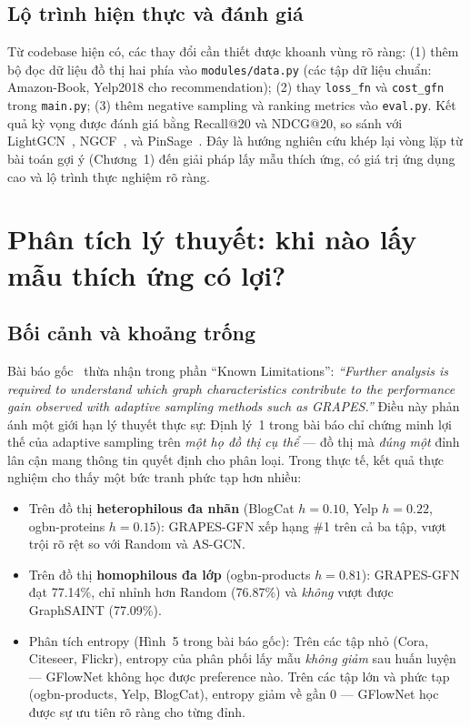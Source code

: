 \subsection{Lộ trình hiện thực và đánh giá}

Từ codebase hiện có, các thay đổi cần thiết được khoanh vùng rõ ràng: (1) thêm bộ đọc dữ liệu đồ thị hai phía vào \texttt{modules/data.py} (các tập dữ liệu chuẩn: Amazon-Book, Yelp2018 cho recommendation); (2) thay \texttt{loss\_fn} và \texttt{cost\_gfn} trong \texttt{main.py}; (3) thêm negative sampling và ranking metrics vào \texttt{eval.py}. Kết quả kỳ vọng được đánh giá bằng Recall@20 và NDCG@20, so sánh với LightGCN~\cite{He2020LightGCN}, NGCF~\cite{Wang2019NGCF}, và PinSage~\cite{Ying2018PinSage}. Đây là hướng nghiên cứu khép lại vòng lặp từ bài toán gợi ý (Chương~1) đến giải pháp lấy mẫu thích ứng, có giá trị ứng dụng cao và lộ trình thực nghiệm rõ ràng.

\section{Phân tích lý thuyết: khi nào lấy mẫu thích ứng có lợi?}
\label{sec:theory}

\subsection{Bối cảnh và khoảng trống}

Bài báo gốc~\cite{Younesian2023GRAPES} thừa nhận trong phần ``Known Limitations'': \textit{``Further analysis is required to understand which graph characteristics contribute to the performance gain observed with adaptive sampling methods such as GRAPES.''} Điều này phản ánh một giới hạn lý thuyết thực sự: Định lý~1 trong bài báo chỉ chứng minh lợi thế của adaptive sampling trên \textit{một họ đồ thị cụ thể} --- đồ thị mà \textit{đúng một} đỉnh lân cận mang thông tin quyết định cho phân loại. Trong thực tế, kết quả thực nghiệm cho thấy một bức tranh phức tạp hơn nhiều:

\begin{itemize}
    \item Trên đồ thị \textbf{heterophilous đa nhãn} (BlogCat $h\!=\!0.10$, Yelp $h\!=\!0.22$, ogbn-proteins $h\!=\!0.15$): GRAPES-GFN xếp hạng \#1 trên cả ba tập, vượt trội rõ rệt so với Random và AS-GCN.
    \item Trên đồ thị \textbf{homophilous đa lớp} (ogbn-products $h\!=\!0.81$): GRAPES-GFN đạt 77.14\%, chỉ nhỉnh hơn Random (76.87\%) và \textit{không} vượt được GraphSAINT (77.09\%).
    \item Phân tích entropy (Hình~5 trong bài báo gốc): Trên các tập nhỏ (Cora, Citeseer, Flickr), entropy của phân phối lấy mẫu \textit{không giảm} sau huấn luyện --- GFlowNet không học được preference nào. Trên các tập lớn và phức tạp (ogbn-products, Yelp, BlogCat), entropy giảm về gần 0 --- GFlowNet học được sự ưu tiên rõ ràng cho từng đỉnh.
\end{itemize}


